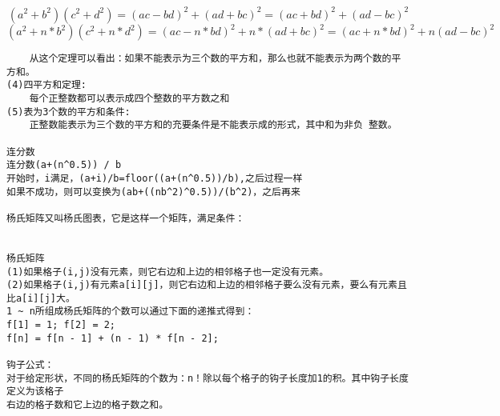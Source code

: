 $$(a^{2}+b^{2})(c^{2}+d^{2})=(ac-bd)^{2}+(ad+bc)^{2}=(ac+bd)^{2}+(ad-bc)^{2}$$
$$(a^{2}+n*b^{2})(c^{2}+n*d^{2})=(ac-n*bd)^{2}+n*(ad+bc)^{2}=(ac+n*bd)^{2}+n(ad-bc)^{2}$$
\begin{verbatim}
    从这个定理可以看出：如果不能表示为三个数的平方和，那么也就不能表示为两个数的平方和。
(4)四平方和定理:
    每个正整数都可以表示成四个整数的平方数之和
(5)表为3个数的平方和条件: 
    正整数能表示为三个数的平方和的充要条件是不能表示成的形式，其中和为非负 整数。

连分数
连分数(a+(n^0.5)) / b
开始时，i满足，(a+i)/b=floor((a+(n^0.5))/b),之后过程一样
如果不成功，则可以变换为(ab+((nb^2)^0.5))/(b^2)，之后再来

杨氏矩阵又叫杨氏图表，它是这样一个矩阵，满足条件：

 
杨氏矩阵
(1)如果格子(i,j)没有元素，则它右边和上边的相邻格子也一定没有元素。
(2)如果格子(i,j)有元素a[i][j]，则它右边和上边的相邻格子要么没有元素，要么有元素且比a[i][j]大。
1 ~ n所组成杨氏矩阵的个数可以通过下面的递推式得到：
f[1] = 1; f[2] = 2;
f[n] = f[n - 1] + (n - 1) * f[n - 2];

钩子公式：
对于给定形状，不同的杨氏矩阵的个数为：n！除以每个格子的钩子长度加1的积。其中钩子长度定义为该格子
右边的格子数和它上边的格子数之和。
\end{verbatim}

